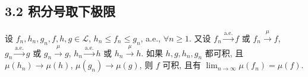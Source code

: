     \subsection{3.2 积分号取下极限}
        \begin{1}
            设 $f_n,h_n,g_n,f,h,g\in\mathcal{L}$, 
            $h_n\leqslant f_n\leqslant g_n$, a.e., $\forall n\geqslant 1$. 
            又设 $f_n\stackrel{\text{a.e.}}{\longrightarrow}f$ 或 $f_n\stackrel{\mu}{\longrightarrow}f$, 
            $g_n\stackrel{\text{a.e.}}{\longrightarrow}g$ 或 $g_n\stackrel{\mu}{\longrightarrow}g$, 
            $h_n\stackrel{\text{a.e.}}{\longrightarrow}h$ 或 $h_n\stackrel{\mu}{\longrightarrow}h$. 
            如果 $h,g,h_n,g_n$ 都可积, 且 $\mu(h_n)\to\mu(h)$, $\mu(g_n)\to\mu(g)$, 
            则 $f$ 可积, 且有 $\displaystyle\lim_{n\to\infty}\mu(f_n)=\mu(f)$.
        \end{1}
